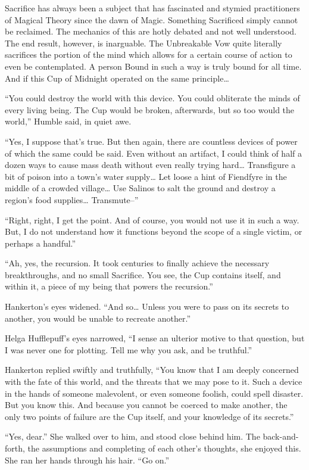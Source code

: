 Sacrifice has always been a subject that has fascinated and stymied practitioners of Magical Theory since the dawn of Magic. Something Sacrificed simply cannot be reclaimed. The mechanics of this are hotly debated and not well understood. The end result, however, is inarguable. The Unbreakable Vow quite literally sacrifices the portion of the mind which allows for a certain course of action to even be contemplated. A person Bound in such a way is truly bound for all time. And if this Cup of Midnight operated on the same principle…

“You could destroy the world with this device. You could obliterate the minds of every living being. The Cup would be broken, afterwards, but so too would the world,” Humble said, in quiet awe.

“Yes, I suppose that’s true. But then again, there are countless devices of power of which the same could be said. Even without an artifact, I could think of half a dozen ways to cause mass death without even really trying hard… Transfigure a bit of poison into a town’s water supply… Let loose a hint of Fiendfyre in the middle of a crowded village… Use Salinos to salt the ground and destroy a region’s food supplies… Transmute–”

“Right, right, I get the point. And of course, you would not use it in such a way. But, I do not understand how it functions beyond the scope of a single victim, or perhaps a handful.”

“Ah, yes, the recursion. It took centuries to finally achieve the necessary breakthroughs, and no small Sacrifice. You see, the Cup contains itself, and within it, a piece of my being that powers the recursion.”

Hankerton’s eyes widened. “And so… Unless you were to pass on its secrets to another, you would be unable to recreate another.”

Helga Hufflepuff’s eyes narrowed, “I sense an ulterior motive to that question, but I was never one for plotting. Tell me why you ask, and be truthful.”

Hankerton replied swiftly and truthfully, “You know that I am deeply concerned with the fate of this world, and the threats that we may pose to it. Such a device in the hands of someone malevolent, or even someone foolish, could spell disaster. But you know this. And because you cannot be coerced to make another, the only two points of failure are the Cup itself, and your knowledge of its secrets.”

“Yes, dear.” She walked over to him, and stood close behind him. The back-and-forth, the assumptions and completing of each other’s thoughts, she enjoyed this. She ran her hands through his hair. “Go on.”

